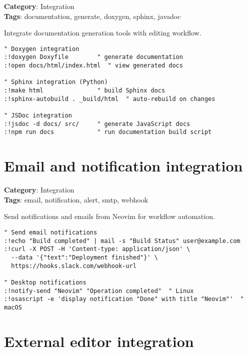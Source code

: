 {{{{{\textbf{Category}: Integration\\ \textbf{Tags}: documentation, generate, doxygen, sphinx, javadoc
\vspace{0.5cm}

Integrate documentation generation tools with editing workflow.

\begin{Exa*}{}
\begin{Verbatim}[fontsize=\footnotesize, breaklines, breakanywhere]
" Doxygen integration
:!doxygen Doxyfile        " generate documentation
:!open docs/html/index.html  " view generated docs

" Sphinx integration (Python)
:!make html               " build Sphinx docs
:!sphinx-autobuild . _build/html  " auto-rebuild on changes

" JSDoc integration
:!jsdoc -d docs/ src/     " generate JavaScript docs
:!npm run docs            " run documentation build script
\end{Verbatim}
\end{Exa*}

\section{Email and notification integration}

\textbf{Category}: Integration\\ \textbf{Tags}: email, notification, alert, smtp, webhook
\vspace{0.5cm}

Send notifications and emails from Neovim for workflow automation.

\begin{Exa*}{}
\begin{Verbatim}[fontsize=\footnotesize, breaklines, breakanywhere]
" Send email notifications
:!echo "Build completed" | mail -s "Build Status" user@example.com
:!curl -X POST -H 'Content-type: application/json' \
  --data '{"text":"Deployment finished"}' \
  https://hooks.slack.com/webhook-url

" Desktop notifications
:!notify-send "Neovim" "Operation completed"  " Linux
:!osascript -e 'display notification "Done" with title "Neovim"'  " macOS
\end{Verbatim}
\end{Exa*}

\section{External editor integration}

}}}}}
